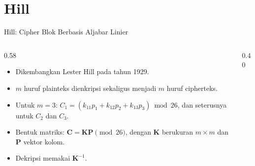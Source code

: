 \documentclass[aspectratio=169,11pt]{beamer}
\begin{document}
\section{Hill}

\begin{frame}{Hill: Cipher Blok Berbasis Aljabar Linier}
    \begin{columns}[T,onlytextwidth]
        \begin{column}{0.58\textwidth}
            \footnotesize
            \begin{itemize}
                \item Dikembangkan Lester Hill pada tahun 1929.
                \item $m$ huruf plainteks dienkripsi sekaligus menjadi $m$
                      huruf cipherteks.
                \item Untuk $m=3$:
                      $C_1=(k_{11}p_1+k_{12}p_2+k_{13}p_3)\bmod 26$,
                      dan seterusnya untuk $C_2$ dan $C_3$.
                \item Bentuk matriks: $\mathbf{C}=\mathbf{KP}\pmod{26}$,
                      dengan $\mathbf{K}$ berukuran $m\times m$ dan
                      $\mathbf{P}$ vektor kolom.
                \item Dekripsi memakai $\mathbf{K}^{-1}$.
            \end{itemize}
        \end{column}
        \begin{column}{0.40\textwidth}
            \centering
        \end{column}
    \end{columns}
\end{frame}
\end{document}

